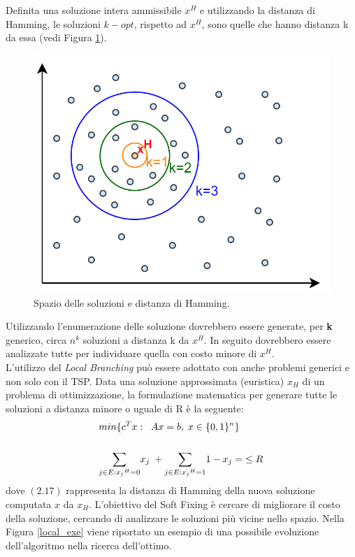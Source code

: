 Definita una soluzione intera ammissibile $x^H$ e utilizzando la distanza di Hamming, le soluzioni $k-opt$, rispetto ad $x^H$, sono quelle che hanno distanza k da essa (vedi Figura \ref{opt}).\\
\begin{figure}[H] 
\begin{center} 
  \includegraphics[scale=0.3]{Images/opt}
  \caption{\footnotesize{Spazio delle soluzioni e distanza di Hamming.}} \label{opt} 
\end{center} 
\end{figure}
Utilizzando l'enumerazione delle soluzione dovrebbero essere generate, per \textbf{k} generico, circa $n^k$ soluzioni a distanza k da $x^H$. In seguito dovrebbero essere analizzate tutte per individuare quella con costo minore di $x^H$.\\
L'utilizzo del \textit{Local Branching} può essere adottato con anche problemi generici e non solo con il TSP. Data una soluzione approssimata (euristica) $x_H$ di un problema di ottimizzazione, la formulazione matematica per generare tutte le soluzioni a distanza minore o uguale di R è la seguente:
\begin{align}
& min \{ c^T x:\;\;Ax=b,\;x\in\{0,1\}^n\} \\ \notag \\
& \underset{j\in E:{x_j}^H=0}\sum{x_j}\;+ \underset{j\in E:{x_j}^H=1}\sum{1-x_j}=\; \leq R
\end{align}
dove $(2.17)$ rappresenta la distanza di Hamming della nuova soluzione computata $x$ da $x_H$. L'obiettivo del Soft Fixing è cercare di migliorare il costo della soluzione, cercando di analizzare le soluzioni più vicine nello spazio. Nella Figura \ref{local_exe} viene riportato un esempio di una possibile evoluzione dell'algoritmo nella ricerca dell'ottimo.
